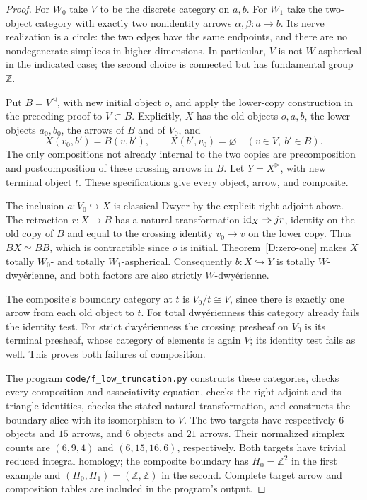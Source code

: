 \begin{proof}
For $W_0$ take $V$ to be the discrete category
on $a,b$. For $W_1$ take the two-object
category with exactly two nonidentity arrows
$\alpha,\beta:a\to b$. Its nerve realization
is a circle: the two edges have the same
endpoints, and there are no nondegenerate
simplices in higher dimensions. In particular,
$V$ is not $W$-aspherical in the indicated
case; the second choice is connected but
has fundamental group $\mathbb Z$.

Put $B=V^{\triangleleft}$, with new initial
object $o$, and apply the lower-copy
construction in the preceding proof to
$V\subset B$. Explicitly, $X$ has the old
objects $o,a,b$, the lower objects $a_0,b_0$,
the arrows of $B$ and of $V_0$, and
\[
 X(v_0,b')=B(v,b'),\qquad
 X(b',v_0)=\varnothing
 \quad(v\in V,\ b'\in B).
\]
The only compositions not already internal
to the two copies are precomposition and
postcomposition of these crossing arrows
in $B$. Let $Y=X^{\triangleright}$, with
new terminal object $t$. These specifications
give every object, arrow, and composite.

The inclusion $a:V_0\hookrightarrow X$
is classical Dwyer by the explicit right
adjoint above. The retraction $r:X\to B$
has a natural transformation
$\mathrm{id}_X\Rightarrow jr$, identity on the
old copy of $B$ and equal to the crossing
identity $v_0\to v$ on the lower copy.
Thus $BX\simeq BB$, which is contractible
since $o$ is initial. Theorem~\ref{D:zero-one}
makes $X$ totally $W_0$- and totally
$W_1$-aspherical. Consequently
$b:X\hookrightarrow Y$ is totally
$W$-dwy\'erienne, and both factors are
also strictly $W$-dwy\'erienne.

The composite's boundary category at $t$
is $V_0/t\cong V$, since there is exactly
one arrow from each old object to $t$.
For total dwy\'erienness this category
already fails the identity test. For strict
dwy\'erienness the crossing presheaf on
$V_0$ is its terminal presheaf, whose
category of elements is again $V$; its
identity test fails as well. This proves
both failures of composition.

The program \texttt{code/f\_low\_truncation.py}
constructs these categories, checks every
composition and associativity equation,
checks the right adjoint and its triangle
identities, checks the stated natural
transformation, and constructs the boundary
slice with its isomorphism to $V$. The two
targets have respectively $6$ objects and
$15$ arrows, and $6$ objects and $21$ arrows.
Their normalized simplex counts are
$(6,9,4)$ and $(6,15,16,6)$, respectively.
Both targets have trivial reduced integral
homology; the composite boundary has
$H_0=\mathbb Z^2$ in the first example
and $(H_0,H_1)=(\mathbb Z,\mathbb Z)$
in the second. Complete target arrow and
composition tables are included in the
program's output.
\end{proof}

